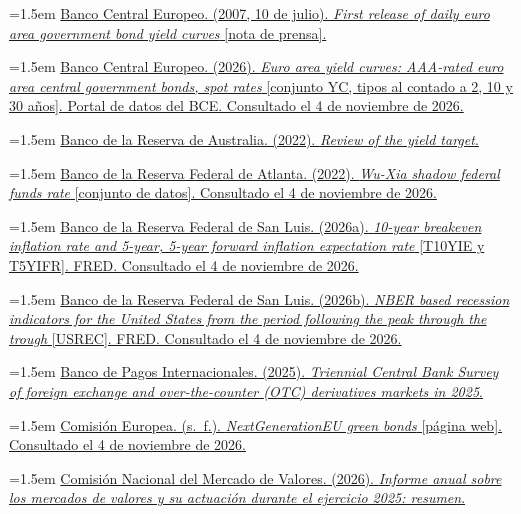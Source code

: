 \documentclass[10pt,a4paper]{article}
\begin{document}
\noindent\hangindent=1.5em \href{https://www.ecb.europa.eu/press/pr/date/2007/html/pr070710.en.html}{Banco Central Europeo. (2007, 10 de julio). \textit{First release of daily euro area government bond yield curves} [nota de prensa].}

\noindent\hangindent=1.5em \href{https://data.ecb.europa.eu/data/datasets/YC}{Banco Central Europeo. (2026). \textit{Euro area yield curves: AAA-rated euro area central government bonds, spot rates} [conjunto YC, tipos al contado a 2, 10 y 30 años]. Portal de datos del BCE. Consultado el 4 de noviembre de 2026.}

\noindent\hangindent=1.5em \href{https://www.rba.gov.au/monetary-policy/reviews/yield-target/}{Banco de la Reserva de Australia. (2022). \textit{Review of the yield target}.}

\noindent\hangindent=1.5em \href{https://www.atlantafed.org/research-and-data/data/wu-xia-shadow-federal-funds-rate}{Banco de la Reserva Federal de Atlanta. (2022). \textit{Wu-Xia shadow federal funds rate} [conjunto de datos]. Consultado el 4 de noviembre de 2026.}

\noindent\hangindent=1.5em \href{https://fred.stlouisfed.org/series/T5YIFR}{Banco de la Reserva Federal de San Luis. (2026a). \textit{10-year breakeven inflation rate and 5-year, 5-year forward inflation expectation rate} [T10YIE y T5YIFR]. FRED. Consultado el 4 de noviembre de 2026.}

\noindent\hangindent=1.5em \href{https://fred.stlouisfed.org/series/USREC}{Banco de la Reserva Federal de San Luis. (2026b). \textit{NBER based recession indicators for the United States from the period following the peak through the trough} [USREC]. FRED. Consultado el 4 de noviembre de 2026.}

\noindent\hangindent=1.5em \href{https://www.bis.org/statistics/rpfx25.htm}{Banco de Pagos Internacionales. (2025). \textit{Triennial Central Bank Survey of foreign exchange and over-the-counter (OTC) derivatives markets in 2025}.}

\noindent\hangindent=1.5em \href{https://commission.europa.eu/strategy-and-policy/eu-budget/eu-borrower-investor-relations/nextgenerationeu-green-bonds_en}{Comisión Europea. (s.~f.). \textit{NextGenerationEU green bonds} [página web]. Consultado el 4 de noviembre de 2026.}

\noindent\hangindent=1.5em \href{https://www.cnmv.es/DocPortal/Publicaciones/Informes/Resumen_InformeAnualCNMV2025.pdf}{Comisión Nacional del Mercado de Valores. (2026). \textit{Informe anual sobre los mercados de valores y su actuación durante el ejercicio 2025: resumen}.}
\end{document}
